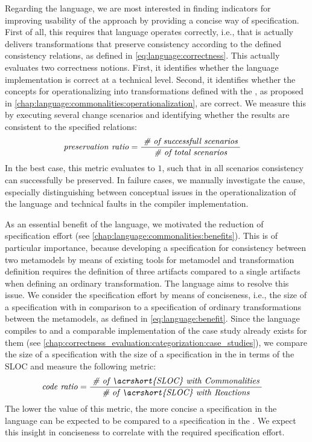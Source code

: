 Regarding the \commonalities language, we are most interested in finding indicators for improving usability of the \commonalities approach by providing a concise way of specification.
First of all, this requires that language operates correctly, i.e., that is actually delivers transformations that preserve consistency according to the defined consistency relations, as defined in \autoref{eq:language:correctness}.
This actually evaluates two correctness notions. 
First, it identifies whether the language implementation is correct at a technical level.
Second, it identifies whether the concepts for operationalizing \commonalities into transformations defined with the \reactionslanguage, as proposed in \autoref{chap:language:commonalities:operationalization}, are correct.
We measure this by executing several change scenarios and identifying whether the results are consistent to the specified relations:
\begin{align*}
    &
    \mathit{preservation\ ratio} = \frac{\; \textit{\# of successfull scenarios} \;}{\; \textit{\# of total scenarios} \;}
\end{align*}
In the best case, this metric evaluates to $1$, such that in all scenarios consistency can successfully be preserved.
In failure cases, we manually investigate the cause, especially distinguishing between conceptual issues in the operationalization of the \commonalities language and technical faults in the compiler implementation.

As an essential benefit of the \commonalities language, we motivated the reduction of specification effort (see \autoref{chap:language:commonalities:benefits}).
This is of particular importance, because developing a \commonalities specification for consistency between two metamodels by means of existing tools for metamodel and transformation definition requires the definition of three artifacts compared to a single artifacts when defining an ordinary transformation.
The \commonalities language aims to resolve this issue.
We consider the specification effort by means of conciseness, i.e., the size of a specification with \commonalities in comparison to a specification of ordinary transformations between the metamodels, as defined in \autoref{eq:language:benefit}.
Since the \commonalities language compiles to \reactions and a comparable implementation of the case study already exists for them (see \autoref{chap:correctness_evaluation:categorization:case_studies}), we compare the size of a \commonalities specification with the size of a specification in the \reactionslanguage in terms of the \gls{SLOC} and measure the following metric:
\begin{align*}
    &
    \mathvariable{code\ ratio} = \frac{\mathtextspacearound{\# of \acrshort{SLOC} with \commonalities}}{\mathtextspacearound{\# of \acrshort{SLOC} with \reactions}}
\end{align*}
The lower the value of this metric, the more concise a specification in the \commonalities language can be expected to be compared to a specification in the \reactionslanguage.
We expect this insight in conciseness to correlate with the required specification effort.


